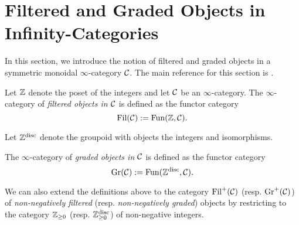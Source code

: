 %	
%

\section{Filtered and Graded Objects in Infinity-Categories}
In this section, we introduce the notion of filtered and graded objects in a symmetric monoidal $\infty$-category ${\mathcal{C}}$.
The main reference for this section is \cite{Brantner-Mathew}.
\begin{definition}
	Let ${\mathbb{Z}}$ denote the poset of the integers and let ${\mathcal{C}}$ be an $\infty$-category.
	The $\infty$-category of \emph{filtered objects in ${\mathcal{C}}$} is defined as the functor category 
	$$
	\operatorname{\operatorname{Fil}}({\mathcal{C}}) :=\operatorname{Fun}({\mathbb{Z}}, {\mathcal{C}}).
	$$
\end{definition}

Let ${\mathbb{Z}}^{\operatorname{disc}}$ denote the groupoid with objects the integers and isomorphisms.
\begin{definition}
	The $\infty$-category of \emph{graded objects in ${\mathcal{C}}$} is defined as the functor category 
	$$
	\operatorname{\operatorname{Gr}}({\mathcal{C}}):=\operatorname{Fun}({\mathbb{Z}}^{\operatorname{disc}}, {\mathcal{C}}).
	$$
\end{definition}

\begin{remark}
	We can also extend the definitions above to the category $\operatorname{\operatorname{Fil}}^{+}({\mathcal{C}})$ (resp. $\operatorname{Gr}^{+}({\mathcal{C}})$) of \emph{non-negatively filtered} (resp. \emph{non-negatively graded}) objects by restricting to the category ${\mathbb{Z}}_{\geq 0}$ (resp. ${\mathbb{Z}}^{\operatorname{disc}}_{\geq 0}$) of non-negative integers.
\end{remark}

